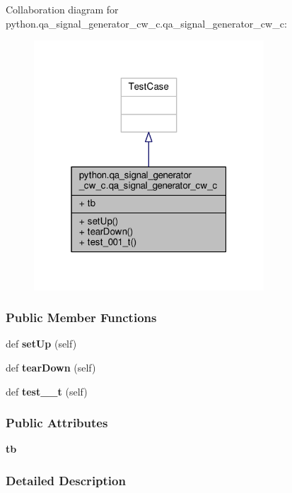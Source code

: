 Collaboration diagram for python.\+qa\+\_\+signal\+\_\+generator\+\_\+cw\+\_\+c.\+qa\+\_\+signal\+\_\+generator\+\_\+cw\+\_\+c\+:
\nopagebreak
\begin{figure}[H]
\begin{center}
\leavevmode
\includegraphics[width=244pt]{d8/d13/classpython_1_1qa__signal__generator__cw__c_1_1qa__signal__generator__cw__c__coll__graph}
\end{center}
\end{figure}
\subsubsection*{Public Member Functions}
\begin{DoxyCompactItemize}
\item 
def {\bf set\+Up} (self)
\item 
def {\bf tear\+Down} (self)
\item 
def {\bf test\+\_\+\_\+t} (self)
\end{DoxyCompactItemize}
\subsubsection*{Public Attributes}
\begin{DoxyCompactItemize}
\item 
{\bf tb}
\end{DoxyCompactItemize}


\subsubsection{Detailed Description}


